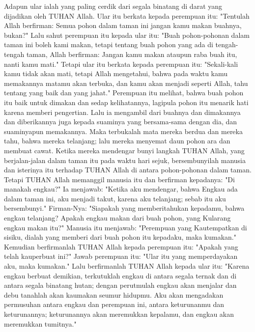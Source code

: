 \begin{biblechapter} %
 Adapun ular ialah yang paling cerdik dari segala binatang di darat yang dijadikan oleh TUHAN Allah. Ular itu berkata kepada perempuan itu: "Tentulah Allah berfirman: Semua pohon dalam taman ini jangan kamu makan buahnya, bukan?"
\verse Lalu sahut perempuan itu kepada ular itu: "Buah pohon-pohonan dalam taman ini boleh kami makan,
\verse tetapi tentang buah pohon yang ada di tengah-tengah taman, Allah berfirman: Jangan kamu makan ataupun raba buah itu, nanti kamu mati."
\verse Tetapi ular itu berkata kepada perempuan itu: "Sekali-kali kamu tidak akan mati,
\verse tetapi Allah mengetahui, bahwa pada waktu kamu memakannya matamu akan terbuka, dan kamu akan menjadi seperti Allah, tahu tentang yang baik dan yang jahat."
\verse Perempuan itu melihat, bahwa buah pohon itu baik untuk dimakan dan sedap kelihatannya, lagipula pohon itu menarik hati karena memberi pengertian. Lalu ia mengambil dari buahnya dan dimakannya dan diberikannya juga kepada suaminya yang bersama-sama dengan dia, dan suaminyapun memakannya.
\verse Maka terbukalah mata mereka berdua dan mereka tahu, bahwa mereka telanjang; lalu mereka menyemat daun pohon ara dan membuat cawat.
\verse Ketika mereka mendengar bunyi langkah TUHAN Allah, yang berjalan-jalan dalam taman itu pada waktu hari sejuk, bersembunyilah manusia dan isterinya itu terhadap TUHAN Allah di antara pohon-pohonan dalam taman.
\verse Tetapi TUHAN Allah memanggil manusia itu dan berfirman kepadanya: "Di manakah engkau?"
\verse Ia menjawab: "Ketika aku mendengar, bahwa Engkau ada dalam taman ini, aku menjadi takut, karena aku telanjang; sebab itu aku bersembunyi."
\verse Firman-Nya: "Siapakah yang memberitahukan kepadamu, bahwa engkau telanjang? Apakah engkau makan dari buah pohon, yang Kularang engkau makan itu?"
\verse Manusia itu menjawab: "Perempuan yang Kautempatkan di sisiku, dialah yang memberi dari buah pohon itu kepadaku, maka kumakan."
\verse Kemudian berfirmanlah TUHAN Allah kepada perempuan itu: "Apakah yang telah kauperbuat ini?" Jawab perempuan itu: "Ular itu yang memperdayakan aku, maka kumakan."
\verse Lalu berfirmanlah TUHAN Allah kepada ular itu: "Karena engkau berbuat demikian, terkutuklah engkau di antara segala ternak dan di antara segala binatang hutan; dengan perutmulah engkau akan menjalar dan debu tanahlah akan kaumakan seumur hidupmu.
\verse Aku akan mengadakan permusuhan antara engkau dan perempuan ini, antara keturunanmu dan keturunannya; keturunannya akan meremukkan kepalamu, dan engkau akan meremukkan tumitnya."

\end{biblechapter}
